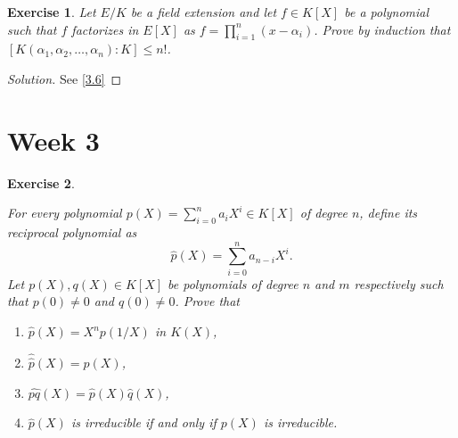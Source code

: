 \documentclass[a4paper,10pt,reqno]{amsart}
\newtheorem{ex}{Exercise}[section]
\newenvironment{sol}
  {\renewcommand\qedsymbol{$\blacksquare$}\begin{proof}[Solution]}
  {\end{proof}}
\begin{document}
\begin{ex}
\label{2.6}
    Let $E/K$ be a field extension and let $f \in K[X]$ be a polynomial such that $f$ factorizes in $E[X]$ as $f = \prod_{i=1}^n(x - \alpha_i)$. Prove by induction that $[K(\alpha_1,\alpha_2, \ldots, \alpha_n):K] \leq n!$.
\end{ex}
\begin{sol}
    See \cref{3.6}
\end{sol}

\newpage

\section{Week 3}


\begin{ex}
\label{3.1}
    
    For every polynomial $p(X)=\sum_{i=0}^n a_iX^i\in K[X]$ of degree $n$,
    define its \emph{reciprocal polynomial} as
    \[
    \widehat{p}(X)=\sum_{i=0}^n a_{n-i}X^i.
    \]
    Let $p(X),q(X)\in K[X]$ be polynomials of degree $n$ and $m$ respectively such that $p(0)\neq 0$ and $q(0)\neq 0$. Prove that
    \begin{enumerate}[label=(\roman*)]
    \item $\widehat{p}(X)=X^np(1/X)$ in $K(X)$,
    \item $\widehat{ \widehat{p}}(X)=p(X)$,
    \item $\widehat{pq}(X)=\widehat{p}(X)\widehat{q}(X)$,
    \item $\widehat{p}(X)$ is irreducible if and only if $p(X)$ is irreducible.
    \end{enumerate}
\end{ex}
\end{document}
